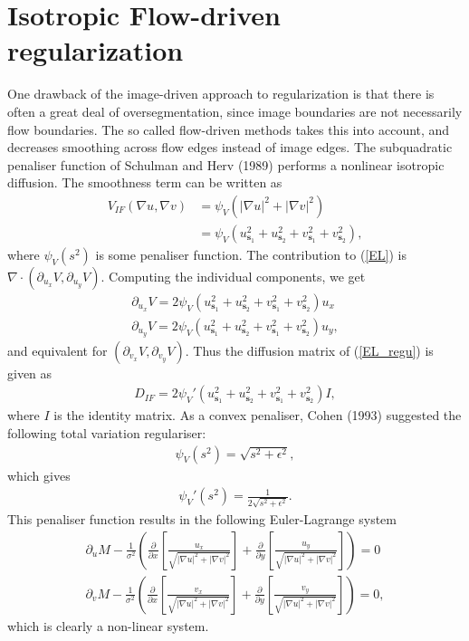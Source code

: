 \documentclass[10pt,a4paper]{article}
\begin{document}
\section{Isotropic Flow-driven regularization}
One drawback of the image-driven approach to regularization is that there is often a great deal of oversegmentation, since image boundaries are not necessarily flow boundaries. The so called flow-driven methods takes this into account, and decreases smoothing across flow edges instead of image edges. The subquadratic penaliser function of Schulman and Herv (1989) performs a nonlinear isotropic diffusion. The smoothness term can be written as
\begin{align*}
V_{IF}(\nabla u, \nabla v) &= \psi_V \left( |\nabla u|^2 + |\nabla v|^2 \right) \\ 
&= \psi_V \left( u_{\textbf{s}_1}^2 + u_{\textbf{s}_2}^2 + v_{\textbf{s}_1}^2 + v_{\textbf{s}_2}^2 \right),
\end{align*} 
where $\psi_V(s^2)$ is some penaliser function. The contribution to (\ref{EL}) is $\nabla \cdot (\partial_{u_x} V, \partial_{u_y} V)$. Computing the individual components, we get
\begin{align*}
\partial_{u_x} V = 2 \psi_V \left( u_{\textbf{s}_1}^2 + u_{\textbf{s}_2}^2 + v_{\textbf{s}_1}^2 + v_{\textbf{s}_2}^2 \right) u_x \\
\partial_{u_y} V = 2 \psi_V \left( u_{\textbf{s}_1}^2 + u_{\textbf{s}_2}^2 + v_{\textbf{s}_1}^2 + v_{\textbf{s}_2}^2 \right) u_y,
\end{align*}
and equivalent for $(\partial_{v_x} V, \partial_{v_y} V)$. Thus the diffusion matrix of (\ref{EL_regu}) is given as
\begin{align*}
D_{IF} = 2 \psi_V'\left( u_{\textbf{s}_1}^2 + u_{\textbf{s}_2}^2 + v_{\textbf{s}_1}^2 + v_{\textbf{s}_2}^2 \right) I,
\end{align*}
where $I$ is the identity matrix. As a convex penaliser, Cohen (1993) suggested the following total variation regulariser:
\begin{align*}
\psi_V(s^2) = \sqrt{s^2 + \epsilon^2},
\end{align*} 
which gives
\begin{align*}
\psi_V'(s^2) = \frac{1}{2 \sqrt{s^2 + \epsilon^2}}.
\end{align*}
This penaliser function results in the following Euler-Lagrange system
\begin{equation}
\begin{aligned}
\label{EL_LD}
\partial_u M - \frac{1}{\sigma^2} \left(\frac{\partial}{\partial x}\left[ \frac{u_x}{\sqrt{|\nabla u|^2 + |\nabla v|^2}} \right] + \frac{\partial}{\partial y} \left[ \frac{u_y}{\sqrt{|\nabla u|^2 + |\nabla v|^2}} \right] \right) = 0 \\
\partial_v M - \frac{1}{\sigma^2} \left(\frac{\partial}{\partial x}\left[ \frac{v_x}{\sqrt{|\nabla u|^2 + |\nabla v|^2}} \right] + \frac{\partial}{\partial y} \left[ \frac{v_y}{\sqrt{|\nabla u|^2 + |\nabla v|^2}} \right] \right) = 0,
\end{aligned}
\end{equation}
which is clearly a non-linear system.
\end{document}
